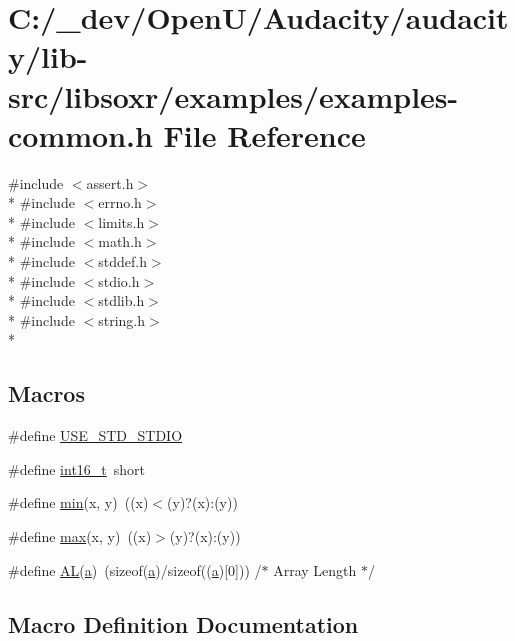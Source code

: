 \hypertarget{examples-common_8h}{}\section{C\+:/\+\_\+dev/\+Open\+U/\+Audacity/audacity/lib-\/src/libsoxr/examples/examples-\/common.h File Reference}
\label{examples-common_8h}
{\ttfamily \#include $<$assert.\+h$>$}\\*
{\ttfamily \#include $<$errno.\+h$>$}\\*
{\ttfamily \#include $<$limits.\+h$>$}\\*
{\ttfamily \#include $<$math.\+h$>$}\\*
{\ttfamily \#include $<$stddef.\+h$>$}\\*
{\ttfamily \#include $<$stdio.\+h$>$}\\*
{\ttfamily \#include $<$stdlib.\+h$>$}\\*
{\ttfamily \#include $<$string.\+h$>$}\\*
\subsection*{Macros}
\begin{DoxyCompactItemize}
\item 
\#define \hyperlink{examples-common_8h_ae8f98482924f7cbfd7a7b7f926b9bb17}{U\+S\+E\+\_\+\+S\+T\+D\+\_\+\+S\+T\+D\+IO}
\item 
\#define \hyperlink{examples-common_8h_aba47ebc2ca6caf60d3de4971843aa4cf}{int16\+\_\+t}~short
\item 
\#define \hyperlink{examples-common_8h_abb702d8b501669a23aa0ab3b281b9384}{min}(x,  y)~((x)$<$(y)?(x)\+:(y))
\item 
\#define \hyperlink{examples-common_8h_ac39d9cef6a5e030ba8d9e11121054268}{max}(x,  y)~((x)$>$(y)?(x)\+:(y))
\item 
\#define \hyperlink{examples-common_8h_acbb4b45d300db3bd8b1f364083e80c1d}{AL}(\hyperlink{rfft2d_test_m_l_8m_a4124bc0a9335c27f086f24ba207a4912}{a})~(sizeof(\hyperlink{rfft2d_test_m_l_8m_a4124bc0a9335c27f086f24ba207a4912}{a})/sizeof((\hyperlink{rfft2d_test_m_l_8m_a4124bc0a9335c27f086f24ba207a4912}{a})\mbox{[}0\mbox{]}))  /$\ast$ Array Length $\ast$/
\end{DoxyCompactItemize}


\subsection{Macro Definition Documentation}
